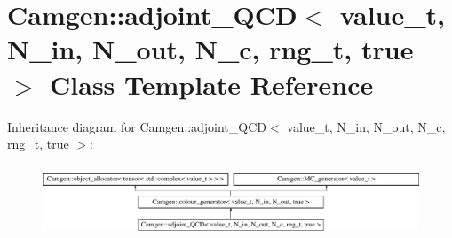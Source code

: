 \hypertarget{a00005}{}\section{Camgen\+:\+:adjoint\+\_\+\+Q\+C\+D$<$ value\+\_\+t, N\+\_\+in, N\+\_\+out, N\+\_\+c, rng\+\_\+t, true $>$ Class Template Reference}
\label{a00005}
Inheritance diagram for Camgen\+:\+:adjoint\+\_\+\+Q\+C\+D$<$ value\+\_\+t, N\+\_\+in, N\+\_\+out, N\+\_\+c, rng\+\_\+t, true $>$\+:\begin{figure}[H]
\begin{center}
\leavevmode
\includegraphics[height=2.170543cm]{a00005}
\end{center}
\end{figure}
